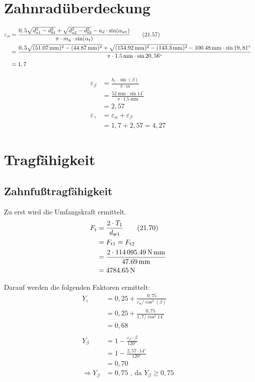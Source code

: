 \documentclass[15pt,a4paper]{article}
\begin{document}
     \section{Zahnradüberdeckung}
    \begin{align*}
    	\varepsilon_{\alpha}&=\frac{0,5\sqrt{d_{a1}^{2} - d_{b1}^{2}}+\sqrt{d_{a2}^2 - d_{b2}^2}-a_d \cdot \sin(\alpha_{\rm wt})}{\pi \cdot m_{\rm n}\cdot  \sin(\alpha_{\rm t})} \tag{21.57} \\
    	&=\frac{0,5\sqrt{(\SI{51,07}{\milli\m})^2-(\SI{44,87}{\milli\m})^2}+\sqrt{(\SI{154,92}{\milli \m})^2- (\SI{143,3}{\milli\m})^2} -\SI{100,48}{\milli\metre}\cdot\sin 19,81^\circ}  {\pi\cdot \SI{1,5}{\milli\metre}\cdot\sin 20,56 ^\circ} \\
    	&= 1,7
    \end{align*}
	
	\begin{align*}
		\varepsilon_{\beta}&=\frac{b_1 \cdot \sin(\beta)}{\pi \cdot m } \tag{21.44}\\
		&=\frac{\SI{52}{\milli\m}\cdot\sin14^\circ}{\pi\cdot \SI{1,5}{\milli\metre}} \\
		&= 2,57 \\    	
		\varepsilon_{\gamma}&=\varepsilon_{\alpha}+\varepsilon_{\beta} \tag{21.46} \\
		&=1,7+2,57 = 4,27
	\end{align*}
     
     
     \section{Tragfähigkeit}
     
     \subsection{Zahnfußtragfähigkeit} \label{Zahnfußtragfähigkeit}
     Zu erst wird die Umfangskraft ermittelt.
     \begin{align*}
     	F_{\rm t} &=\frac{2 \cdot T_{1}}{d_{\rm w1}}\tag{21.70}\\
     	&=F_{\rm t1} = F_{\rm t2} \\
     	&=\frac{2\cdot\SI{114095,49}{\newton\milli\metre}}{\SI{47,69}{\milli\m}} \\
     	&=\SI{4784,65}{\newton}
     \end{align*}
     
     Darauf werden die folgenden Faktoren ermittelt:
     \begin{align*}
     	Y_{\varepsilon}&=0,25 +\frac{ 0,75}{\varepsilon_{\alpha}/\cos^{2}(\beta)} \tag{RM 21.5.4-1 S.828} \\
     	&=0,25+\frac{0,75}{1,7/\cos^2 14^\circ} \\
     	&= 0,68\\     	\\
     	Y_{\beta}&=1-\frac{\varepsilon_{\beta} \cdot \beta}{\ang{120}} \tag{TB 21-19 c)}\\
     	&=1-\frac{2,57\cdot \ang{14}}{\ang{120}}\\
     	&=0,70\\
     	\Rightarrow 	Y_{\beta}&= 0,75 \text{ , da } Y_{\beta} \geq 0,75
     \end{align*}
     
\end{document}
